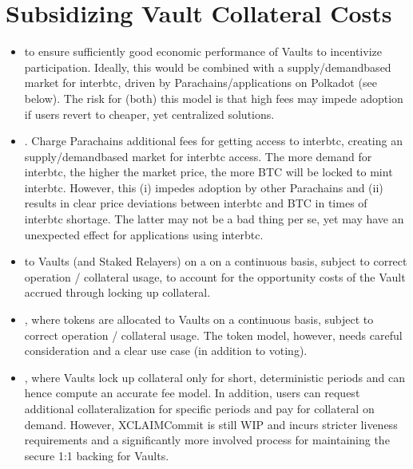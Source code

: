 \documentclass[a4paper,10pt,english]{sphinxmanual}
\begin{document}
\section{Subsidizing Vault Collateral Costs}
\label{\detokenize{economics/fees:subsidizing-vault-collateral-costs}}\begin{itemize}
\item {} 
 to ensure sufficiently good economic performance of Vaults to incentivize participation. Ideally, this would be combined with a supply/demand\sphinxhyphen{}based market for interbtc, driven by Parachains/applications on Polkadot (see below). The risk for (both) this model is that high fees may impede adoption if users revert to cheaper, yet centralized solutions.

\item {} 
. Charge Parachains additional fees for getting access to interbtc, creating an supply/demand\sphinxhyphen{}based market for interbtc access. The more demand for interbtc, the higher the market price, the more BTC will be locked to mint interbtc. However, this (i) impedes adoption by other Parachains and (ii) results in clear price deviations between interbtc and BTC in times of interbtc shortage. The latter may not be a bad thing per se, yet may have an unexpected effect for applications using interbtc.

\item {} 
 to Vaults (and Staked Relayers) on a on a continuous basis, subject to correct operation / collateral usage, to account for the opportunity costs of the Vault accrued through locking up collateral.

\item {} 
, where tokens are allocated to Vaults on a continuous basis, subject to correct operation / collateral usage. The token model, however, needs careful consideration and a clear use case (in addition to voting).

\item {} 
, where Vaults lock up collateral only for short, deterministic periods and can hence compute an accurate fee model. In addition, users can request additional collateralization for specific periods and pay for collateral on demand. However, XCLAIM\sphinxhyphen{}Commit is still WIP and incurs stricter liveness requirements and a significantly more involved process for maintaining the secure 1:1 backing for Vaults.

\end{itemize}
\end{document}
